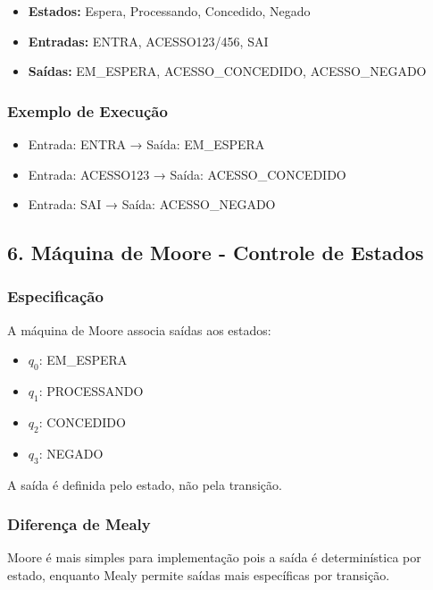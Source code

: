 \documentclass[12pt,a4paper]{article}
\begin{document}
\begin{itemize}
    \item \textbf{Estados:} Espera, Processando, Concedido, Negado
    \item \textbf{Entradas:} ENTRA, ACESSO123/456, SAI
    \item \textbf{Saídas:} EM_ESPERA, ACESSO_CONCEDIDO, ACESSO_NEGADO
\end{itemize}

\subsubsection{Exemplo de Execução}

\begin{itemize}
    \item Entrada: ENTRA → Saída: EM_ESPERA
    \item Entrada: ACESSO123 → Saída: ACESSO_CONCEDIDO
    \item Entrada: SAI → Saída: ACESSO_NEGADO
\end{itemize}

\subsection{6. Máquina de Moore - Controle de Estados}

\subsubsection{Especificação}

A máquina de Moore associa saídas aos estados:

\begin{itemize}
    \item $q_0$: EM_ESPERA
    \item $q_1$: PROCESSANDO
    \item $q_2$: CONCEDIDO
    \item $q_3$: NEGADO
\end{itemize}

A saída é definida pelo estado, não pela transição.

\subsubsection{Diferença de Mealy}

Moore é mais simples para implementação pois a saída é determinística por estado, enquanto Mealy permite saídas mais específicas por transição.
\end{document}
